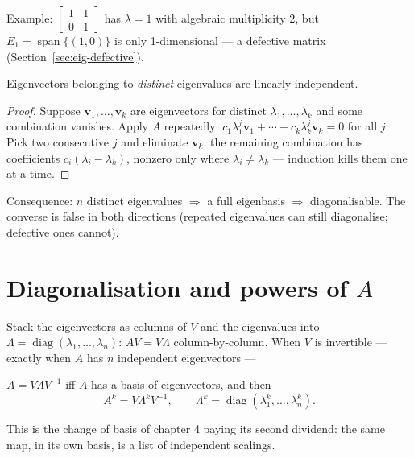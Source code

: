 Example: $\begin{bmatrix}1&1\\0&1\end{bmatrix}$ has $\lambda=1$ with
algebraic multiplicity 2, but $E_1=\operatorname{span}\{(1,0)\}$ is only
1-dimensional --- a defective matrix (Section~\ref{sec:eig-defective}).

\begin{theorem}\label{th:eig-indep}
Eigenvectors belonging to \emph{distinct} eigenvalues are linearly
independent.
\end{theorem}

\begin{proof}
Suppose $\mathbf v_1,\dots,\mathbf v_k$ are eigenvectors for distinct
$\lambda_1,\dots,\lambda_k$ and some combination vanishes. Apply $A$
repeatedly: $c_1\lambda_1^j\mathbf v_1+\cdots+c_k\lambda_k^j\mathbf v_k=0$
for all $j$. Pick two consecutive $j$ and eliminate $\mathbf v_k$: the
remaining combination has coefficients $c_i(\lambda_i-\lambda_k)$, nonzero
only where $\lambda_i\ne\lambda_k$ --- induction kills them one at a time.
\end{proof}

Consequence: $n$ distinct eigenvalues $\Rightarrow$ a full eigenbasis
$\Rightarrow$ diagonalisable. The converse is false in both directions
(repeated eigenvalues can still diagonalise; defective ones cannot).

\section{Diagonalisation and powers of \texorpdfstring{$A$}{A}}\label{sec:eig-diag}

Stack the eigenvectors as columns of $V$ and the eigenvalues into
$\Lambda=\operatorname{diag}(\lambda_1,\dots,\lambda_n)$:
$AV=V\Lambda$ column-by-column. When $V$ is invertible --- exactly when $A$
has $n$ independent eigenvectors ---

\begin{theorem}[Diagonalisation]
$A=V\Lambda V^{-1}$ iff $A$ has a basis of eigenvectors, and then
\[
A^k=V\Lambda^{k}V^{-1},\qquad
\Lambda^k=\operatorname{diag}(\lambda_1^k,\dots,\lambda_n^k).
\]
\end{theorem}

This is the change of basis of chapter 4 paying its second dividend: the
same map, in its own basis, is a list of independent scalings.

